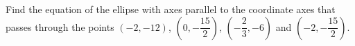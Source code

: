 Find the equation of the ellipse with axes parallel to the coordinate axes that passes through the points $(-2,-12)$, $\left(0,-\dfrac{15}2\right)$, $\left(-\dfrac23,-6\right)$ and $\left(-2,-\dfrac{15}2\right)$.
